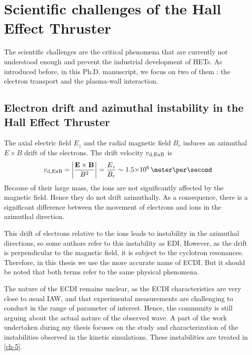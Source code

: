 
\section{Scientific challenges of the Hall Effect Thruster}

The scientific challenges are the critical phenomena that are currently not understood enough and prevent the industrial development of \ac{HET}s.
As introduced before, in this Ph.D. manuscript, we focus on two of them : the electron transport and the plasma-wall interaction.


\subsection{Electron drift and azimuthal instability in the Hall Effect Thruster}

The axial electric field $E_z$ and the radial magnetic field $B_r$ induces an azimuthal $E\times B$ drift of the electrons.
The drift velocity $v_{\rm d, ExB}$ is 
\begin{equation} \label{eq-exbdriftbis}
  v_{\rm d, ExB} = \bigg\lvert \frac{\vect{E} \times \vect{B}}{B^2} \bigg\rvert = \frac{E_z}{B_r} \sim \sn{1.5}{6} \,\meter\per\second
\end{equation}
Because of their large mass, the ions are not significantly affected by the magnetic field.
Hence they do not drift azimuthally.
As a consequence, there is a significant difference between the movement of electrons and ions in the azimuthal direction.

This drift of electrons relative to the ions leads to instability in the azimuthal directions, so some  authors refer to this instability as \ac{EDI}.
However, as the drift is perpendicular to the magnetic field, it is subject to the cyclotron resonances.
Therefore, in this thesis we use the more accurate name of \ac{ECDI}.
But it should be noted that both terms refer to the same physical phenomena.

The nature of the \ac{ECDI} remains unclear\citep{boeuf2018}, as the \ac{ECDI} characteristics are very close to usual \ac{IAW}, and that experimental measurements are challenging to conduct in the range of parameter of interest.
Hence, the community is still arguing about the actual nature of the observed wave.
A part of the work undertaken during my thesis focuses on the study and characterization of the instabilities observed in the kinetic simulations.
These instabilities are treated in \cref{ch-5}.


